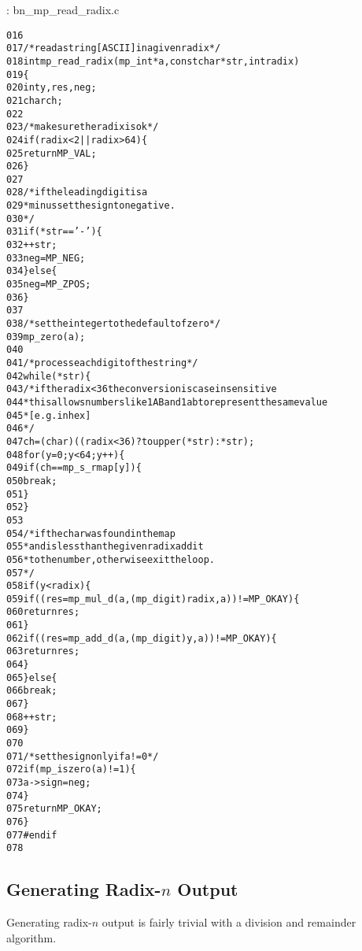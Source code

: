 \documentclass[b5paper]{book}
\begin{document}
\vspace{+3mm}\begin{small}
\hspace{-5.1mm}{\bf File}: bn\_mp\_read\_radix.c
\vspace{-3mm}
\begin{alltt}
016   
017   /* read a string [ASCII] in a given radix */
018   int mp_read_radix (mp_int * a, const char *str, int radix)
019   \{
020     int     y, res, neg;
021     char    ch;
022   
023     /* make sure the radix is ok */
024     if (radix < 2 || radix > 64) \{
025       return MP_VAL;
026     \}
027   
028     /* if the leading digit is a 
029      * minus set the sign to negative. 
030      */
031     if (*str == '-') \{
032       ++str;
033       neg = MP_NEG;
034     \} else \{
035       neg = MP_ZPOS;
036     \}
037   
038     /* set the integer to the default of zero */
039     mp_zero (a);
040     
041     /* process each digit of the string */
042     while (*str) \{
043       /* if the radix < 36 the conversion is case insensitive
044        * this allows numbers like 1AB and 1ab to represent the same  value
045        * [e.g. in hex]
046        */
047       ch = (char) ((radix < 36) ? toupper (*str) : *str);
048       for (y = 0; y < 64; y++) \{
049         if (ch == mp_s_rmap[y]) \{
050            break;
051         \}
052       \}
053   
054       /* if the char was found in the map 
055        * and is less than the given radix add it
056        * to the number, otherwise exit the loop. 
057        */
058       if (y < radix) \{
059         if ((res = mp_mul_d (a, (mp_digit) radix, a)) != MP_OKAY) \{
060            return res;
061         \}
062         if ((res = mp_add_d (a, (mp_digit) y, a)) != MP_OKAY) \{
063            return res;
064         \}
065       \} else \{
066         break;
067       \}
068       ++str;
069     \}
070     
071     /* set the sign only if a != 0 */
072     if (mp_iszero(a) != 1) \{
073        a->sign = neg;
074     \}
075     return MP_OKAY;
076   \}
077   #endif
078   
\end{alltt}
\end{small}

\subsection{Generating Radix-$n$ Output}
Generating radix-$n$ output is fairly trivial with a division and remainder algorithm.  
\end{document}
